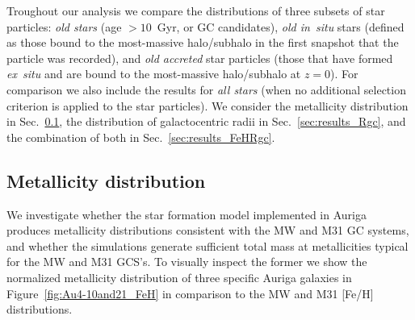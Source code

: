 \documentclass[a4paper,fleqn,usenatbib]{mnras}
\begin{document}
Troughout our analysis we compare the distributions of three subsets of star
particles: \emph{old stars} (age $>10$~Gyr, or GC candidates), \emph{old in~situ}
stars (defined as those bound to the most-massive halo/subhalo in the first
snapshot that the particle was recorded), and \emph{old accreted} star particles
(those that have formed {\it ex~situ} and are bound to the most-massive halo/subhalo
at $z=0$). For comparison we also include the results for \emph{all stars} (when
no additional selection criterion is applied to the star particles). We consider
the metallicity distribution in Sec.~\ref{sec:results_FeH}, the distribution of
galactocentric radii in Sec.~\ref{sec:results_Rgc}, and the combination of both
in Sec.~\ref{sec:results_FeHRgc}.


\subsection{Metallicity distribution}
\label{sec:results_FeH}
We investigate whether the star formation model implemented in Auriga produces
metallicity distributions consistent with the MW and M31 GC systems, and whether
the simulations generate sufficient total mass at metallicities typical for the
MW and M31 GCS's. To visually inspect the former we show the normalized metallicity 
distribution of three specific Auriga galaxies in Figure~\ref{fig:Au4-10and21_FeH}
in comparison to the MW and M31 [Fe/H] distributions.
\end{document}
